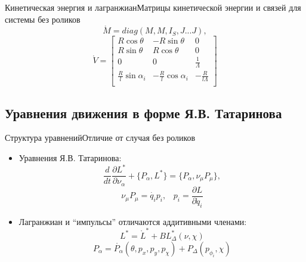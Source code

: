 \begin{frame}{Кинетическая энергия и лагранжиан}{Матрицы кинетической энергии и связей для системы без роликов}
    $$ \mathring{M} = diag(M, M, I_S, J...J), $$
    $$ \mathring{V} = \begin{bmatrix}
        R\cos\theta & -R\sin\theta & 0 \\
        R\sin\theta & R\cos\theta  & 0 \\
        0           & 0            & \frac{1}{\Lambda} \\
        \frac{R}{l}\sin\alpha_i & -\frac{R}{l}\cos\alpha_i & -\frac{R}{l\Lambda} \\
    \end{bmatrix} $$
\end{frame}

\subsection{Уравнения движения в форме Я.В. Татаринова}

\begin{frame}{Структура уравнений}{Отличие от случая без роликов}
  \begin{itemize}
  \item {
    Уравнения Я.В. Татаринова:
    \begin{equation}\label{Tatarinov}
    \frac{d}{dt}\frac{\partial L^{*}}{\partial \nu_\alpha}  + \{P_\alpha, L^{*}\} = \{P_\alpha, \nu_\mu P_\mu\},
    \end{equation}
    $$ \nu_\mu P_\mu = \dot{q_i} p_i, \hspace{10pt} p_i = \frac{\partial L}{\partial \dot{q}_i} $$
  }
  \item {
    Лагранжиан и ``импульсы'' отличаются аддитивными членами:
    $$ L^{*} = \mathring{L}^{*} + BL^{*}_\Delta(\nu, \chi) $$
    $$ P_\alpha = \mathring{P_\alpha}(\theta, p_x, p_y, p_\chi) + P_\Delta(p_{\phi_i}, \chi) $$
  }

  \end{itemize}
\end{frame}

